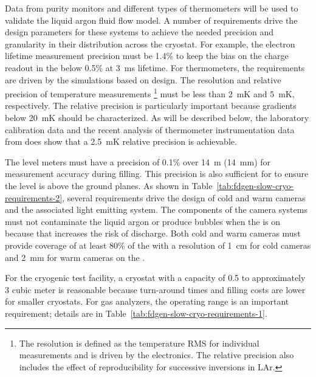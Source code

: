 Data from purity monitors and different types of thermometers will be used to validate the liquid argon fluid flow model. A number of requirements drive the design parameters for these systems to achieve the needed precision and granularity in their distribution across the cryostat. For example, the electron lifetime measurement precision must be 1.4\% to keep the bias on the charge readout in the  below 0.5\% at 3~ms lifetime. For thermometers, the requirements are driven by the  simulations based on  design. The resolution and relative precision of temperature measurements
\footnote{The resolution is defined as the temperature RMS for individual measurements and is driven by the electronics. The relative precision also includes the effect of reproducibility for successive inversions in LAr.}
must be less than 2~mK and 5~mK, respectively.  The relative precision is particularly important because gradients below 20~mK should be characterized.  
As will be described below, the laboratory calibration data and the recent analysis of thermometer instrumentation data from  does show that a 2.5~mK relative precision is achievable. 

The level meters must have a precision of 0.1\% over 14~m (14~mm) for measurement accuracy during filling. This precision is also sufficient for  to ensure the  level is above the ground planes. As shown in Table~\ref{tab:fdgen-slow-cryo-requirements-2}, several requirements drive the design of cold and warm cameras and the associated light emitting system. The components of the camera systems must not contaminate the liquid argon or produce bubbles when the  is on because that increases the risk of  discharge. Both cold and warm cameras must provide coverage of at least 80\% of the  with a resolution of 1~cm for cold cameras and 2~mm for warm cameras on the .

For the cryogenic test facility, a cryostat with a capacity of 0.5 to approximately 3 cubic meter is reasonable because turn-around times and filling costs are lower for smaller cryostats. For gas analyzers, the operating range is an important requirement; details  are in Table~\ref{tab:fdgen-slow-cryo-requirements-1}.

